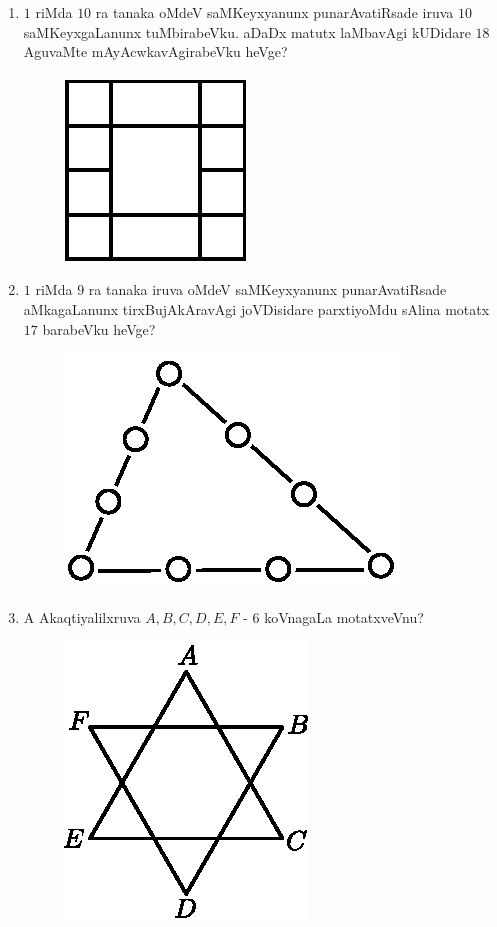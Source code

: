 \begin{enumerate}
\item $1$ riMda $10$ ra tanaka oMdeV saMKeyxyanunx punarAvatiRsade iruva $10$ saMKeyxgaLanunx tuMbirabeVku. aDaDx matutx laMbavAgi kUDidare $18$ AguvaMte mAyAcwkavAgirabeVku heVge?
\begin{figure}[H]
\centering
\includegraphics{src/figures/exr13.eps}
\end{figure}

\item $1$ riMda $9$ ra tanaka iruva oMdeV saMKeyxyanunx punarAvatiRsade aMkagaLanunx tirxBujAkAravAgi joVDisidare parxtiyoMdu sAlina motatx $17$ barabeVku heVge?
\begin{figure}[H]
\centering
\includegraphics{src/figures/exr14.eps}
\end{figure}

\item A Akaqtiyalilxruva $A,B,C,D,E,F$ - $6$ koVnagaLa motatxveVnu?
\begin{figure}[H]
\centering
\includegraphics{src/figures/exr15.eps}
\end{figure}


\end{enumerate}
